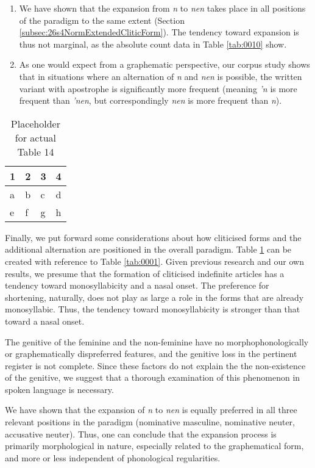\begin{enumerate}
	\item We have shown that the expansion from \textit{n} to \textit{nen} takes place in all positions of the paradigm to the same extent (Section \ref{subsec:26s4NormExtendedCliticForm}).
	The tendency toward expansion is thus not marginal, as the absolute count data in Table \ref{tab:0010} show.
	\item As one would expect from a graphematic perspective, our corpus study shows that in situations where an alternation of \textit{n} and \textit{nen} is possible, the written variant with apostrophe is significantly more frequent (meaning \textit{'n} is more frequent than \textit{'nen}, but correspondingly \textit{nen} is more frequent than \textit{n}).
\end{enumerate}

\begin{table}
	\centering
	\begin{tabular}{llll}
		\toprule
		\textbf{1} & \textbf{2} & \textbf{3} & \textbf{4} \\
		\midrule
		a & b & c & d \\
		e & f & g & h \\
		\bottomrule
	\end{tabular}
	\caption{Placeholder for actual Table 14}
	\label{tab:0014}
\end{table}

Finally, we put forward some considerations about how cliticised forms and the additional alternation are positioned in the overall paradigm.
Table \ref{tab:0014} can be created with reference to Table \ref{tab:0001}. %
Given previous research and our own results, we presume that the formation of cliticised indefinite articles has a tendency toward monosyllabicity and a nasal onset.
The preference for shortening, naturally, does not play as large a role in the forms that are already monosyllabic.
Thus, the tendency toward monosyllabicity is stronger than that toward a nasal onset.

The genitive of the feminine and the non-feminine have no morphophonologically or graphematically dispreferred features, and the genitive loss in the pertinent register is not complete.
Since these factors do not explain the the non-existence of the genitive, we suggest that a thorough examination of this phenomenon in spoken language is necessary.

We have shown that the expansion of \textit{n} to \textit{nen} is equally preferred in all three relevant positions in the paradigm (nominative masculine, nominative neuter, accusative neuter).
Thus, one can conclude that the expansion process is primarily morphological in nature, especially related to the graphematical form, and more or less independent of phonological regularities.

